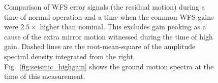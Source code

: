 \begin{figure}
\begin{centering}
\caption[Comparison of WFS error signals (the residual motion) during
a time of normal operation and a time when the common WFS gains were
$2.5\times$ higher than nominal]{Comparison of WFS error signals (the
  residual motion) during a time of normal operation and a time when
  the common WFS gains were $2.5\times$ higher than nominal. This
  excludes gain peaking as a cause of the extra mirror motion
  witnessed during the time of high gain. Dashed lines are the
  root-mean-square of the amplitude spectral density integrated from
  the right. Fig.~\ref{fig:seismic_highgain} shows the ground motion
  spectra at the time of this measurement.}
\label{fig:WFS_inputbeam}
\end{centering}
\end{figure}










